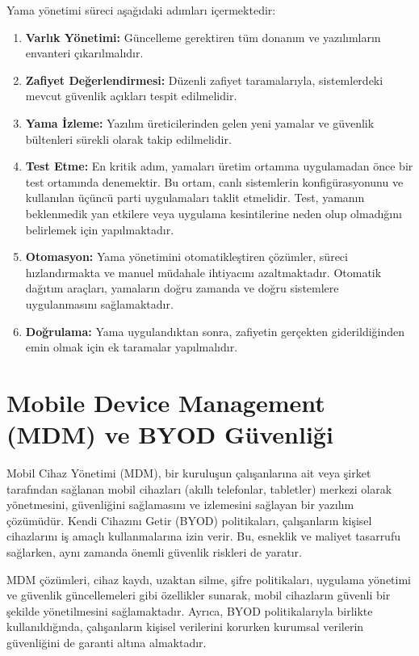 Yama yönetimi süreci aşağıdaki adımları içermektedir:

\begin{enumerate}
    \item \textbf{Varlık Yönetimi:} Güncelleme gerektiren tüm donanım ve yazılımların envanteri çıkarılmalıdır.
    \item \textbf{Zafiyet Değerlendirmesi:} Düzenli zafiyet taramalarıyla, sistemlerdeki mevcut güvenlik açıkları tespit edilmelidir.
    \item \textbf{Yama İzleme:} Yazılım üreticilerinden gelen yeni yamalar ve güvenlik bültenleri sürekli olarak takip edilmelidir.
    \item \textbf{Test Etme:} En kritik adım, yamaları üretim ortamına uygulamadan önce bir test ortamında denemektir. Bu ortam, canlı sistemlerin konfigürasyonunu ve kullanılan üçüncü parti uygulamaları taklit etmelidir. Test, yamanın beklenmedik yan etkilere veya uygulama kesintilerine neden olup olmadığını belirlemek için yapılmaktadır.
    \item \textbf{Otomasyon:} Yama yönetimini otomatikleştiren çözümler, süreci hızlandırmakta ve manuel müdahale ihtiyacını azaltmaktadır. Otomatik dağıtım araçları, yamaların doğru zamanda ve doğru sistemlere uygulanmasını sağlamaktadır.
    \item \textbf{Doğrulama:} Yama uygulandıktan sonra, zafiyetin gerçekten giderildiğinden emin olmak için ek taramalar yapılmalıdır.
\end{enumerate}

\section{Mobile Device Management (MDM) ve BYOD Güvenliği}

Mobil Cihaz Yönetimi (MDM), bir kuruluşun çalışanlarına ait veya şirket tarafından sağlanan mobil cihazları (akıllı telefonlar, tabletler) merkezi olarak yönetmesini, güvenliğini sağlamasını ve izlemesini sağlayan bir yazılım çözümüdür. Kendi Cihazını Getir (BYOD) politikaları, çalışanların kişisel cihazlarını iş amaçlı kullanmalarına izin verir. Bu, esneklik ve maliyet tasarrufu sağlarken, aynı zamanda önemli güvenlik riskleri de yaratır.

MDM çözümleri, cihaz kaydı, uzaktan silme, şifre politikaları, uygulama yönetimi ve güvenlik güncellemeleri gibi özellikler sunarak, mobil cihazların güvenli bir şekilde yönetilmesini sağlamaktadır. Ayrıca, BYOD politikalarıyla birlikte kullanıldığında, çalışanların kişisel verilerini korurken kurumsal verilerin güvenliğini de garanti altına almaktadır.

